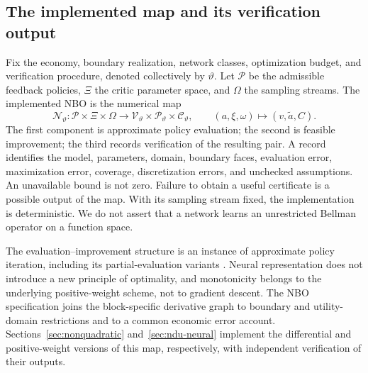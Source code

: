\documentclass[ecta,nameyear,draft]{econsocart}
\theoremstyle{definition}
\theoremstyle{remark}
\begin{document}
\subsection{The implemented map and its verification output}\label{sec:implemented}
Fix the economy, boundary realization, network classes, optimization budget, and verification procedure, denoted collectively by $\vartheta$. Let $\mathcal P$ be the admissible feedback policies, $\Xi$ the critic parameter space, and $\Omega$ the sampling streams. The implemented NBO is the numerical map
\begin{equation}\label{eq:implemented-r6}
 \mathcal N_\vartheta:\mathcal P\times\Xi\times\Omega
 \longrightarrow\mathcal V_\vartheta\times\mathcal P_\vartheta\times\mathcal C_\vartheta,
 \qquad(a,\xi,\omega)\longmapsto(v,\widetilde a,C).
\end{equation}
The first component is approximate policy evaluation; the second is feasible improvement; the third records verification of the resulting pair. A record identifies the model, parameters, domain, boundary faces, evaluation error, maximization error, coverage, discretization errors, and unchecked assumptions. An unavailable bound is not zero. Failure to obtain a useful certificate is a possible output of the map. With its sampling stream fixed, the implementation is deterministic. We do not assert that a network learns an unrestricted Bellman operator on a function space.

The evaluation--improvement structure is an instance of approximate policy iteration, including its partial-evaluation variants \citep{scherrer2015}. Neural representation does not introduce a new principle of optimality, and monotonicity belongs to the underlying positive-weight scheme, not to gradient descent. The NBO specification joins the block-specific derivative graph to boundary and utility-domain restrictions and to a common economic error account. Sections~\ref{sec:nonquadratic} and~\ref{sec:ndu-neural} implement the differential and positive-weight versions of this map, respectively, with independent verification of their outputs.
\end{document}
